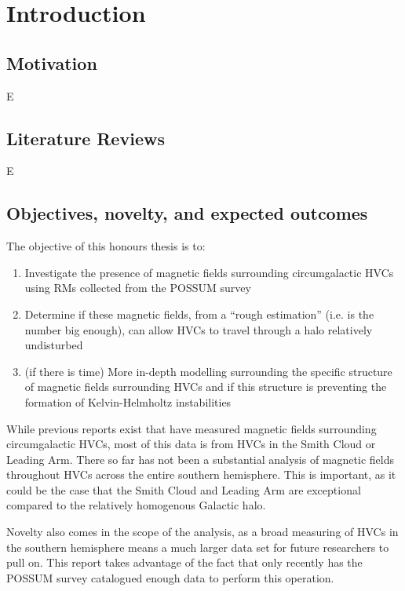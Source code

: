 \chapter{Introduction}
\label{cha:introduction}

\section{Motivation}
\label{sec:motivation}
E~\cite{LH:83}

\section{Literature Reviews}
\label{sec:lit-review}
E

\section{Objectives, novelty, and expected outcomes}
\label{sec:objectives}

The objective of this honours thesis is to:
\begin{enumerate}
\item Investigate the presence of magnetic fields surrounding circumgalactic HVCs using RMs collected from the POSSUM survey
\item Determine if these magnetic fields, from a “rough estimation” (i.e. is the number big enough), can allow HVCs to travel through a halo relatively undisturbed
\item (if there is time) More in-depth modelling surrounding the specific structure of magnetic fields surrounding HVCs and if this structure is preventing the formation of Kelvin-Helmholtz instabilities
\end{enumerate}

While previous reports exist that have measured magnetic fields surrounding circumgalactic HVCs, most of this data is from HVCs in the Smith Cloud or Leading Arm. There so far has not been a substantial analysis of magnetic fields throughout HVCs across the entire southern hemisphere. This is important, as it could be the case that the Smith Cloud and Leading Arm are exceptional compared to the relatively homogenous Galactic halo.

Novelty also comes in the scope of the analysis, as a broad measuring of HVCs in the southern hemisphere means a much larger data set for future researchers to pull on. This report takes advantage of the fact that only recently has the POSSUM survey catalogued enough data to perform this operation.

